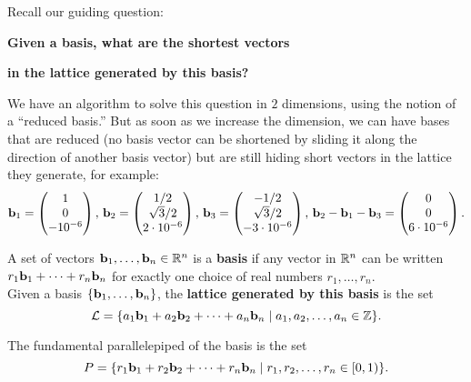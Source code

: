 

Recall our guiding question:
\begin{center}
	\textbf{Given a basis, what are the shortest vectors}
	
	\textbf{in the lattice generated by this basis?}
\end{center}

We have an algorithm to solve this question in $2$ dimensions, using the notion of a ``reduced basis.'' But as soon as we increase the dimension, we can have bases that are reduced (no basis vector can be shortened by sliding it along the direction of another basis vector) but are still hiding short vectors in the lattice they generate, for example:
	\[\mathbf{b}_1=\begin{pmatrix}
	1\\0\\-10^{-6}
	\end{pmatrix},\,\mathbf{b}_2=\begin{pmatrix}
	1/2 \\ \sqrt{3}/2 \\ 2\cdot 10^{-6}
	\end{pmatrix},\,\mathbf{b}_3=\begin{pmatrix}
	-1/2 \\ \sqrt{3}/2 \\ -3\cdot 10^{-6}
	\end{pmatrix},\,\mathbf{b}_2-\mathbf{b}_1-\mathbf{b}_3=\begin{pmatrix}
	0 \\ 0 \\ 6\cdot 10^{-6}
	\end{pmatrix}.\]

\begin{defns}

A set of vectors $\mathbf{b}_1,\ldots,\mathbf{b}_n\in\mathbb{R}^n$ is a \textbf{\color{magenta}basis} if any vector in $\mathbb{R}^n$ can be written $r_1\mathbf{b}_1+\cdots+r_n\mathbf{b}_n$ for exactly one choice of real numbers $r_1,\ldots,r_n$.
\\

Given a {\color{magenta}basis $\{\mathbf{b}_1,\ldots,\mathbf{b}_n\}$}, the \textbf{\color{gray} lattice generated by this basis} is the set
	\[\mathcal{L}=\{a_1\mathbf{b}_1+a_2\mathbf{b}_2+\cdots+a_n\mathbf{b}_n\mid a_1,a_2,\ldots,a_n\in \mathbb{Z}\}.\]

The {\color{magenta}fundamental parallelepiped of the basis} is the set
	\[P=\{r_1\mathbf{b}_1+r_2\mathbf{b}_2+\cdots+r_n\mathbf{b}_n\mid r_1,r_2,\ldots,r_n\in [0,1)\}.\]
\end{defns}

\begin{comment}
A basis matrix will always be invertible\footnote{A matrix $M$ is invertible if there exists a matrix $M^{-1}$ with the property that $MM^{-1}$ is the identity matrix ($1$s on the top-left-to-bottom-right diagonal, and $0$s everywhere else).} (Exploration~\ref{exp:basisinv}).

\begin{explor}\label{exp:basisinv}
	Become convinced that any basis matrix is, in fact, invertible. \color{DarkGreen}(Hint: Think of the matrix as a linear map. What does it do to vectors in the standard basis?)
\end{explor}
\end{comment}

